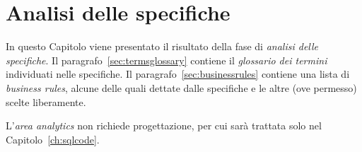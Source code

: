 \chapter{Analisi delle specifiche}
In questo Capitolo viene presentato il risultato della fase di {\it analisi delle specifiche}. Il
paragrafo~\vref{sec:termsglossary} contiene il {\it glossario dei termini} individuati
nelle specifiche. %
Il paragrafo~\vref{sec:businessrules} contiene una lista di {\it business rules},
alcune delle quali dettate dalle specifiche e le altre (ove permesso) scelte liberamente.

L'{\it area analytics} non richiede progettazione, per cui sarà trattata solo nel Capitolo~\vref{ch:sqlcode}.

%

